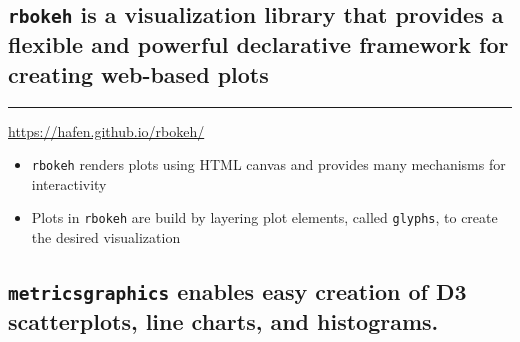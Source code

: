 \documentclass[]{book}
\newenvironment{Shaded}{\begin{snugshade}}{\end{snugshade}}
\newcommand{\KeywordTok}[1]{\textcolor[rgb]{0.13,0.29,0.53}{\textbf{{#1}}}}
\newcommand{\DataTypeTok}[1]{\textcolor[rgb]{0.13,0.29,0.53}{{#1}}}
\newcommand{\DecValTok}[1]{\textcolor[rgb]{0.00,0.00,0.81}{{#1}}}
\newcommand{\StringTok}[1]{\textcolor[rgb]{0.31,0.60,0.02}{{#1}}}
\newcommand{\NormalTok}[1]{{#1}}
\theoremstyle{definition}
\theoremstyle{definition}
\theoremstyle{remark}
\begin{document}
\hypertarget{htmlwidget-d6708e7cab39b0e3bd03}{}

\subsection{\texorpdfstring{\texttt{rbokeh} is a visualization library
that provides a flexible and powerful declarative framework for creating
web-based
plots}{rbokeh is a visualization library that provides a flexible and powerful declarative framework for creating web-based plots}}\label{rbokeh-is-a-visualization-library-that-provides-a-flexible-and-powerful-declarative-framework-for-creating-web-based-plots}

\begin{Shaded}
\end{Shaded}

\hypertarget{htmlwidget-f89675372b5dcd4d18c2}{}

\begin{center}\rule{0.5\linewidth}{\linethickness}\end{center}

\url{https://hafen.github.io/rbokeh/}

\begin{itemize}
\item
  \texttt{rbokeh} renders plots using HTML canvas and provides many
  mechanisms for interactivity
\item
  Plots in \texttt{rbokeh} are build by layering plot elements, called
  \texttt{glyphs}, to create the desired visualization
\end{itemize}

\subsection{\texorpdfstring{\texttt{metricsgraphics} enables easy
creation of D3 scatterplots, line charts, and
histograms.}{metricsgraphics enables easy creation of D3 scatterplots, line charts, and histograms.}}\label{metricsgraphics-enables-easy-creation-of-d3-scatterplots-line-charts-and-histograms.}
\end{document}
